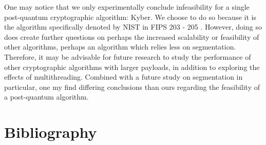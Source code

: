 \documentclass[a4paper]{article}
\begin{document}
One may notice that we only experimentally conclude infeasibility for a
single post-quantum cryptographic algorithm: Kyber. We choose to do so
because it is the algorithm specifically denoted by NIST in FIPS 203 -
205 \autocite{ThreeDraftFIPS2023}. However, doing so does create further
questions on perhaps the increased scalability or feasibility of other
algorithms, perhaps an algorithm which relies less on segmentation.
Therefore, it may be advisable for future research to study the
performance of other cryptographic algorithms with larger payloads, in
addition to exploring the effects of multithreading. Combined with a
future study on segmentation in particular, one my find differing
conclusions than ours regarding the feasibility of a post-quantum
algorithm.

\section{Bibliography}

\printbibliography
\end{document}
